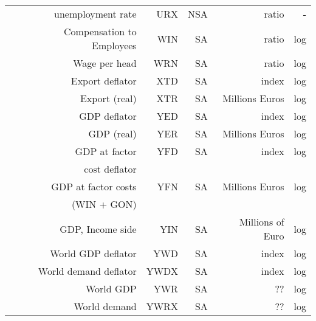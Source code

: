 \documentclass[11pt,a4paper]{article}
\begin{document}
\begin{table}[htbp]
{\begin{tabular}{rrrrrr}
    \multicolumn{1}{c}{} &
      unemployment rate &
      URX &
      NSA &
      ratio &
      -
      \\
    
      \multicolumn{1}{c}{} &
      Compensation to Employees &
      WIN &
      SA &
      ratio &
      log
      \\
      
      \multicolumn{1}{c}{} &
      Wage per head &
      WRN &
      SA &
      ratio &
      log
      \\
      
      \multicolumn{1}{c}{} &
      Export deflator &
      XTD &
      SA &
      index &
      log
      \\
      
       \multicolumn{1}{c}{} &
      Export (real) &
      XTR &
      SA &
      Millions Euros &
      log
      \\
    
    \multicolumn{1}{c}{} &
      GDP deflator &
      YED &
      SA &
      index &
      log
      \\
      
     \multicolumn{1}{c}{} &
      GDP (real) &
      YER &
      SA &
      Millions Euros &
      log
      \\
      
      \multicolumn{1}{c}{} &
      GDP at factor &
      YFD &
      SA &
      index &
      log
      \\
      \multicolumn{1}{c}{} &
      cost deflator &
      &
      &
      &
      
      \\
    
    \multicolumn{1}{c}{} &
      GDP at factor costs &
      YFN &
      SA &
      Millions Euros &
      log
      \\
      \multicolumn{1}{c}{} &
      (WIN + GON) &
      &
      &
      &
      
      \\
      
      \multicolumn{1}{c}{} &
      GDP, Income side &
      YIN &
      SA &
      Millions of Euro &
      log
      \\


      \multicolumn{1}{c}{} &
      World GDP deflator &
      YWD &
      SA &
      index &
      log
      \\

      \multicolumn{1}{c}{} &
      World demand deflator&
      YWDX &
      SA &
      index &
      log
      \\


    \multicolumn{1}{c}{} &
      World GDP &
      YWR &
      SA &
      ?? &
      log
      \\



    \multicolumn{1}{c}{} &
      World demand &
      YWRX &
      SA &
      ?? &
      log
      \\
    \bottomrule
    \end{tabular}

  \label{tab:addlabel}
}
\end{table}
\end{document}

